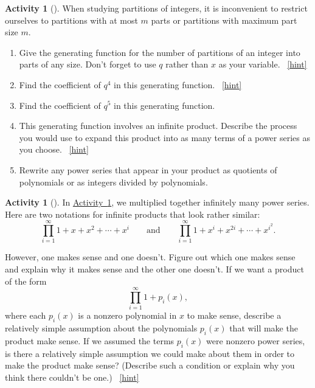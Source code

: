 \documentclass[10pt,]{book}
\theoremstyle{plain}
\theoremstyle{definition}
\theoremstyle{definition}
\theoremstyle{definition}
\newtheorem{activity}[project]{Activity}
\numberwithin{equation}{chapter}
\begin{document}
\begin{activity}[]\label{genfunpartitions}
\hypertarget{p-1168}{}%
When studying partitions of integers, it is inconvenient to restrict ourselves to partitions with at most \(m\) parts or partitions with maximum part size \(m\).%
\begin{enumerate}[font=\bfseries,label=(\alph*),ref=\alph*]
\item\label{task-202} \hypertarget{p-1169}{}%
Give the generating function for the number of partitions of an integer into parts of any size. Don't forget to use \(q\) rather than \(x\) as your variable.%
~\hfill{\tiny\hyperlink{a-257.a}{[hint]}\hypertarget{q-257.a}{}}\item\label{task-203} \hypertarget{p-1172}{}%
Find the coefficient of \(q^4\) in this generating function.%
~\hfill{\tiny\hyperlink{a-257.b}{[hint]}\hypertarget{q-257.b}{}}\item\label{task-204} \hypertarget{p-1175}{}%
Find the coefficient of \(q^5\) in this generating function.%
\item\label{task-205} \hypertarget{p-1177}{}%
This generating function involves an infinite product. Describe the process you would use to expand this product into as many terms of a power series as you choose.%
~\hfill{\tiny\hyperlink{a-257.d}{[hint]}\hypertarget{q-257.d}{}}\item\label{task-206} \hypertarget{p-1180}{}%
Rewrite any power series that appear in your product as quotients of polynomials or as integers divided by polynomials.%
\end{enumerate}
\end{activity}
\begin{activity}[]\label{activity-258}
\hypertarget{p-1182}{}%
In \hyperref[genfunpartitions]{Activity~\ref{genfunpartitions}}, we multiplied together infinitely many power series. Here are two notations for infinite products that look rather similar:%
\begin{equation*}
\prod_{i=1}^\infty 1 + x + x^2 +\cdots+ x^i\qquad\mbox{and}\qquad
\prod_{i=1}^\infty 1 +x^i +x^{2i} +\cdots + x^{i^2}.
\end{equation*}
%
\par
\hypertarget{p-1183}{}%
However, one makes sense and one doesn't. Figure out which one makes sense and explain why it makes sense and the other one doesn't. If we want a product of the form%
\begin{equation*}
\prod_{i=1}^\infty 1 +p_i(x),
\end{equation*}
where each \(p_i(x)\) is a nonzero polynomial in \(x\) to make sense, describe a relatively simple assumption about the polynomials \(p_i(x)\) that will make the product make sense. If we assumed the terms \(p_i(x)\) were nonzero power series, is there a relatively simple assumption we could make about them in order to make the product make sense? (Describe such a condition or explain why you think there couldn't be one.)%
~\hfill{\tiny\hyperlink{a-258}{[hint]}\hypertarget{q-258}{}}\end{activity}
\end{document}
